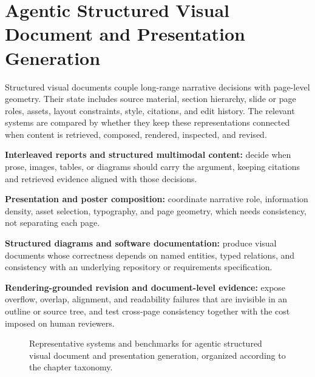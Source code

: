 \section{Agentic Structured Visual Document and Presentation Generation}
\label{sec:structured-documents}

Structured visual documents couple long-range narrative decisions with page-level geometry. Their state includes source material, section hierarchy, slide or page roles, assets, layout constraints, style, citations, and edit history. The relevant systems are compared by whether they keep these representations connected when content is retrieved, composed, rendered, inspected, and revised.


\begin{keytakeaway}
\begin{keypoints}
  \item \textbf{Interleaved reports and structured multimodal content:} decide when prose, images, tables, or diagrams should carry the argument, keeping citations and retrieved evidence aligned with those decisions.

  \item \textbf{Presentation and poster composition:} coordinate narrative role, information density, asset selection, typography, and page geometry, which needs consistency, not separating each page.

  \item \textbf{Structured diagrams and software documentation:} produce visual documents whose correctness depends on named entities, typed relations, and consistency with an underlying repository or requirements specification.

  \item \textbf{Rendering-grounded revision and document-level evidence:} expose overflow, overlap, alignment, and readability failures that are invisible in an outline or source tree, and test cross-page consistency together with the cost imposed on human reviewers.
\end{keypoints}
\end{keytakeaway}

\begin{figure}[!htbp]
  \centering
  
  \caption{Representative systems and benchmarks for agentic structured visual document and presentation generation, organized according to the chapter taxonomy.}
  \label{fig:ch8-representative-systems}
\end{figure}

